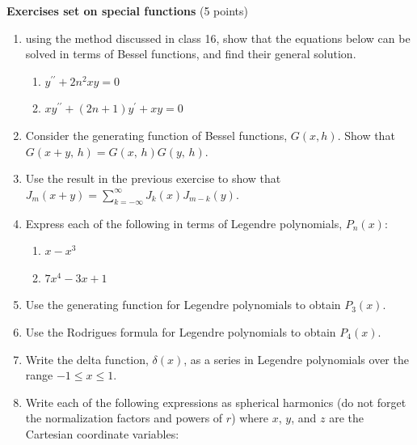 \documentclass[fleqn]{article}
\begin{document}
  \textbf{Exercises set on special functions} (5 points)
  \begin{enumerate}
    \item using the method discussed in class 16, show that the equations below can be solved in terms of Bessel functions, and find their general solution.
    
    \begin{enumerate}
    \item $y^{\prime \prime }+2n^{2}xy=0$
    
    \item $xy^{\prime \prime }+\left( 2n+1\right) y^{\prime }+xy=0$
    \end{enumerate}
    
    
    
    \item Consider the generating function of Bessel functions, $G(x,h)$. Show that $G\left( x+y,\,h\right) =G\left( x,\,h\right) G\left(
    y,\,h\right) .$
    
    \item Use the result in the previous exercise to show that $J_{m}\left( x+y\right) =\sum\limits_{k=-\infty}^{\infty }J_{k}\left( x\right) J_{m-k}\left( y\right) .$
    
    
    \item Express each of the following in terms of Legendre polynomials, $
    P_{n}\left( x\right) $:
      
      \begin{enumerate}
        \item $x-x^{3}$
        
        \item $7x^{4}-3x+1$
      \end{enumerate}
    
    \item Use the generating function for Legendre polynomials to obtain $P_{3}\left(x\right)$.
    
    \item Use the Rodrigues formula for Legendre polynomials to obtain $P_{4}\left(x\right)$.
    
    
    \item Write the delta function, $\delta \left( x\right)$, as a series in Legendre polynomials over the range \newline $-1\leq x\leq 1$.
    
    
    \item Write each of the following expressions as spherical harmonics (do not forget the normalization factors and powers of $r$) where $x$, $y$, and $z$ are the Cartesian coordinate variables:
    

\end{enumerate}
\end{document}
